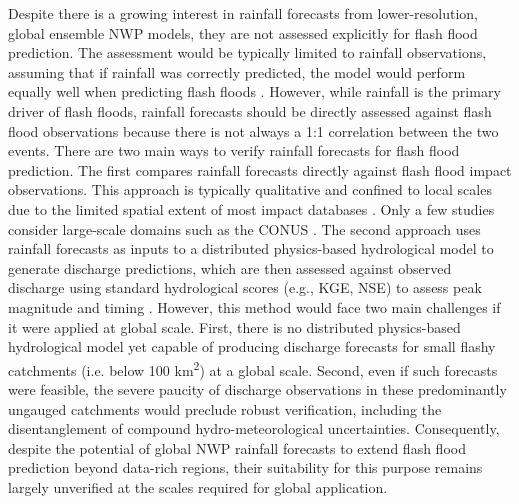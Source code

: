 Despite  there is a growing interest in rainfall forecasts from lower-resolution, global ensemble NWP models, they are not assessed explicitly for flash flood prediction. The assessment would be typically limited to rainfall observations, assuming that if rainfall was correctly predicted, the model would perform equally well when predicting flash floods \citep{Gascón_2024}. However, while rainfall is the primary driver of flash floods, rainfall forecasts should be directly assessed against flash flood observations because there is not always a 1:1 correlation between the two events. There are two main ways to verify rainfall forecasts for flash flood prediction. The first compares rainfall forecasts directly against flash flood impact observations. This approach is typically qualitative and confined to local scales \citep{Tripathy_2020} due to the limited spatial extent of most impact databases \citep{Gaume_2009}. Only a few studies consider large-scale domains such as the CONUS \citep{Herman_2016a}. The second approach uses rainfall forecasts as inputs to a distributed physics-based hydrological model to generate discharge predictions, which are then assessed against observed discharge using standard hydrological scores (e.g., KGE, NSE) to assess peak magnitude and timing \citep{Maidment_1992}. However, this method would face two main challenges if it were applied at global scale. First, there is no distributed physics-based hydrological model yet capable of producing discharge forecasts for small flashy catchments (i.e. below 100 km\textsuperscript{2}) at a global scale. Second, even if such forecasts were feasible, the severe paucity of discharge observations in these predominantly ungauged catchments \citep{Clerc-Schwarzenbach_2024} would preclude robust verification, including the disentanglement of compound hydro-meteorological uncertainties. Consequently, despite the potential of global NWP rainfall forecasts to extend flash flood prediction beyond data-rich regions, their suitability for this purpose remains largely unverified at the scales required for global application.

